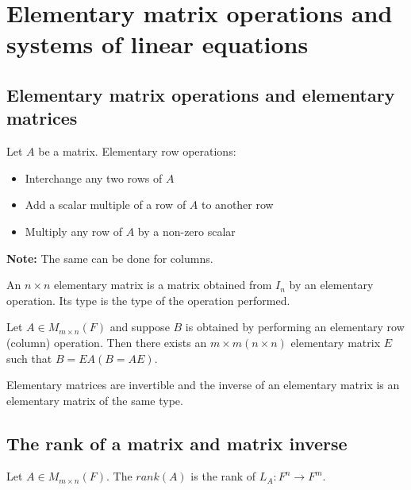 \documentclass[12pt]{article}
\newenvironment{theorem}[2][Theorem]{\begin{trivlist}
\item[\hskip \labelsep {\bfseries #1}\hskip \labelsep {\bfseries #2.}]}{\end{trivlist}}
\newenvironment{definition}[2][Definition]{\begin{trivlist}
\item[\hskip \labelsep {\bfseries #1}\hskip \labelsep {\bfseries #2}]}{\end{trivlist}}
\begin{document}
\section{Elementary matrix operations and systems of linear equations}

\subsection{Elementary matrix operations and elementary matrices}

\begin{definition}{1}
Let $A$ be a matrix. Elementary row operations:

\begin{itemize}
    \item Interchange any two rows of $A$
    
    \item Add a scalar multiple of a row of $A$ to another row
    
    \item Multiply any row of $A$ by a non-zero scalar
\end{itemize}
\end{definition}

\noindent \textbf{Note:} The same can be done for columns.

\begin{definition}{2}
An $n \times n$ elementary matrix is a matrix obtained from $I_n$ by an elementary operation. Its type is the type of the operation performed.
\end{definition}

\begin{theorem}{3.1}
Let $A \in M_{m \times n}(F)$ and suppose $B$ is obtained by performing an elementary row (column) operation. Then there exists an $m \times m (n \times n)$ elementary matrix $E$ such that $B = EA (B = AE)$.
\end{theorem}

\begin{theorem}{3.2}
Elementary matrices are invertible and the inverse of an elementary matrix is an elementary matrix of the same type.
\end{theorem}

\subsection{The rank of a matrix and matrix inverse}

\begin{definition}{3}
Let $A \in M_{m \times n}(F)$. The $rank(A)$ is the rank of $L_A : F^n \to F^m$.
\end{definition}
\end{document}
